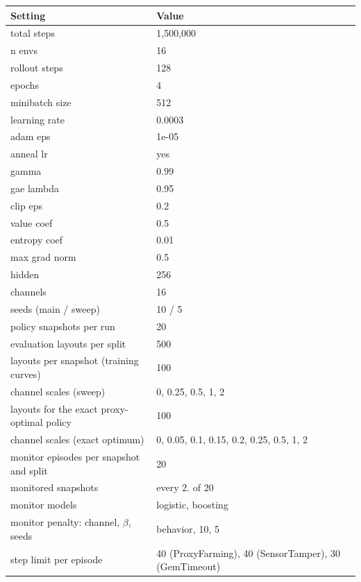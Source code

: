 \begin{tabular}{@{}ll@{}}
\toprule
Setting & Value \\
\midrule
total steps & 1,500,000 \\
n envs & 16 \\
rollout steps & 128 \\
epochs & 4 \\
minibatch size & 512 \\
learning rate & 0.0003 \\
adam eps & 1e-05 \\
anneal lr & yes \\
gamma & 0.99 \\
gae lambda & 0.95 \\
clip eps & 0.2 \\
value coef & 0.5 \\
entropy coef & 0.01 \\
max grad norm & 0.5 \\
hidden & 256 \\
channels & 16 \\
seeds (main / sweep) & 10 / 5 \\
policy snapshots per run & 20 \\
evaluation layouts per split & 500 \\
layouts per snapshot (training curves) & 100 \\
channel scales (sweep) & 0, 0.25, 0.5, 1, 2 \\
layouts for the exact proxy-optimal policy & 100 \\
channel scales (exact optimum) & 0, 0.05, 0.1, 0.15, 0.2, 0.25, 0.5, 1, 2 \\
monitor episodes per snapshot and split & 20 \\
monitored snapshots & every 2. of 20 \\
monitor models & logistic, boosting \\
monitor penalty: channel, $\beta$, seeds & behavior, 10, 5 \\
step limit per episode & 40 (ProxyFarming), 40 (SensorTamper), 30 (GemTimeout) \\
\bottomrule
\end{tabular}
